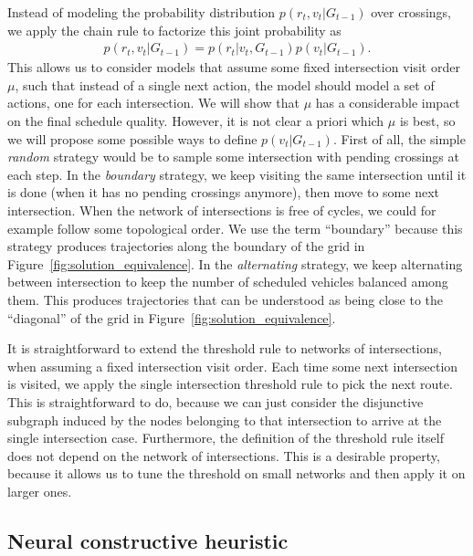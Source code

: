 \documentclass[a4paper]{article}
\theoremstyle{definition}
\theoremstyle{plain}
\begin{document}
Instead of modeling the probability distribution $p(r_{t}, v_{t} | G_{t-1})$
over crossings, we apply the chain rule to factorize this joint probability as
\begin{align*}
  p(r_{t}, v_{t} | G_{t-1}) = p(r_{t} | v_{t} , G_{t-1}) p (v_{t} | G_{t-1}) .
\end{align*}
This allows us to consider models that assume some fixed intersection visit
order $\mu$, such that instead of a single next action, the model should model a
set of actions, one for each intersection.
%
We will show that $\mu$ has a considerable impact on the final schedule quality.
However, it is not clear a priori which $\mu$ is best, so we will propose some
possible ways to define $p(v_{t} | G_{t-1})$.
First of all, the simple \textit{random} strategy would be to sample some
intersection with pending crossings at each step.
In the \textit{boundary} strategy, we keep visiting the same intersection until
it is done (when it has no pending crossings anymore), then move to some next
intersection. When the network of intersections is free of cycles, we could for
example follow some topological order. We use the term ``boundary'' because this
strategy produces trajectories along the boundary of the grid in
Figure~\ref{fig:solution_equivalence}.
In the \textit{alternating} strategy, we keep alternating between intersection
to keep the number of scheduled vehicles balanced among them. This produces
trajectories that can be understood as being close to the ``diagonal'' of the
grid in Figure~\ref{fig:solution_equivalence}.

It is straightforward to extend the threshold rule to networks of
intersections, when assuming a fixed intersection visit order. Each time some
next intersection is visited, we apply the single intersection threshold rule to
pick the next route. This is straightforward to do, because we can just consider
the disjunctive subgraph induced by the nodes belonging to that intersection to
arrive at the single intersection case.
%
Furthermore, the definition of the threshold rule itself does not depend on the
network of intersections. This is a desirable property, because it allows us to
tune the threshold on small networks and then apply it on larger ones.


\subsection{Neural constructive heuristic}
\end{document}

